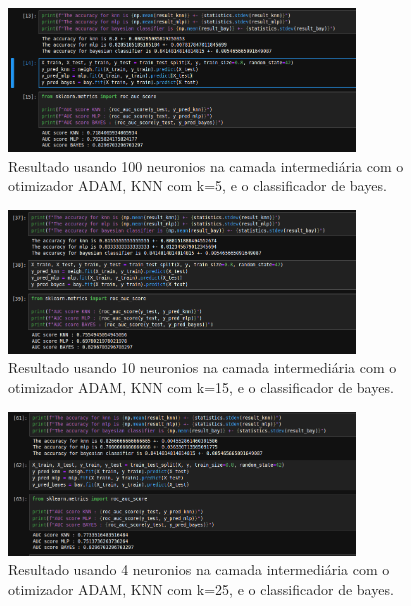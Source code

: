 \documentclass{article}
\begin{document}
\begin{figure}[h]

    \centering
    \includegraphics[height=1.5in]{result_1.png}
    \caption{Resultado usando 100 neuronios na camada intermediária com o otimizador ADAM, KNN com k=5, e o classificador de bayes.}
    \label{fig:example}
    
\end{figure}

\vspace{10pt}

\begin{figure}[h]

    \centering
    \includegraphics[height=1.5in]{result_2.png}
    \caption{Resultado usando 10 neuronios na camada intermediária com o otimizador ADAM, KNN com k=15, e o classificador de bayes.}
    \label{fig:example}
    
\end{figure}

\vspace{10pt}


\vspace{10pt}

\begin{figure}[h]

    \centering
    \includegraphics[height=1.5in]{result_3.png}
    \caption{Resultado usando 4 neuronios na camada intermediária com o otimizador ADAM, KNN com k=25, e o classificador de bayes.}
    \label{fig:example}
    
\end{figure}
\end{document}
